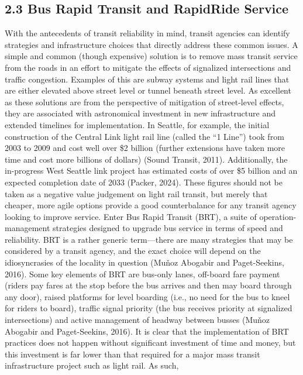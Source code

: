 \documentclass[
  12pt,
]{article}
\begin{document}
\subsection{2.3 Bus Rapid Transit and RapidRide
Service}\label{bus-rapid-transit-and-rapidride-service}

With the antecedents of transit reliability in mind, transit agencies
can identify strategies and infrastructure choices that directly address
these common issues. A simple and common (though expensive) solution is
to remove mass transit service from the roads in an effort to mitigate
the effects of signalized intersections and traffic congestion. Examples
of this are subway systems and light rail lines that are either elevated
above street level or tunnel beneath street level. As excellent as these
solutions are from the perspective of mitigation of street-level
effects, they are associated with astronomical investment in new
infrastructure and extended timelines for implementation. In Seattle,
for example, the initial construction of the Central Link light rail
line (called the ``1 Line'') took from 2003 to 2009 and cost well over
\$2 billion (further extensions have taken more time and cost more
billions of dollars) (Sound Transit, 2011). Additionally, the
in-progress West Seattle link project has estimated costs of over \$5
billion and an expected completion date of 2033 (Packer, 2024). These
figures should not be taken as a negative value judgement on light rail
transit, but merely that cheaper, more agile options provide a good
counterbalance for any transit agency looking to improve service. Enter
Bus Rapid Transit (BRT), a suite of operation-management strategies
designed to upgrade bus service in terms of speed and reliability. BRT
is a rather generic term---there are many strategies that may be
considered by a transit agency, and the exact choice will depend on the
idiosyncrasies of the locality in question (Muňoz Abogabir and
Paget-Seekins, 2016). Some key elements of BRT are bus-only lanes,
off-board fare payment (riders pay fares at the stop before the bus
arrives and then may board through any door), raised platforms for level
boarding (i.e., no need for the bus to kneel for riders to board),
traffic signal priority (the bus receives priority at signalized
intersections) and active management of headway between busses (Muňoz
Abogabir and Paget-Seekins, 2016). It is clear that the implementation
of BRT practices does not happen without significant investment of time
and money, but this investment is far lower than that required for a
major mass transit infrastructure project such as light rail. As such,
\end{document}
